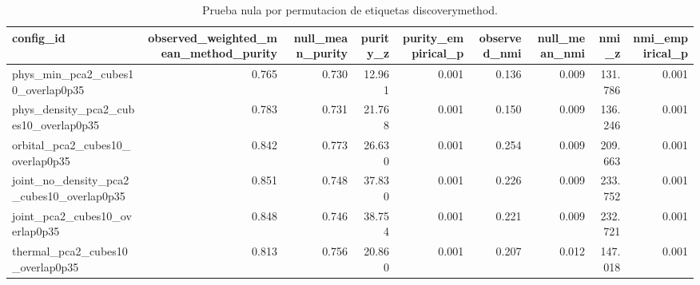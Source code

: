 \begin{table}[H]
\centering
\scriptsize
\caption{Prueba nula por permutacion de etiquetas discoverymethod.}
\label{tab:bias_permutation_null}
\begin{adjustbox}{max width=\linewidth}
\begin{tabular}{lrrrrrrrr}
\toprule
config\_id & observed\_weighted\_mean\_method\_purity & null\_mean\_purity & purity\_z & purity\_empirical\_p & observed\_nmi & null\_mean\_nmi & nmi\_z & nmi\_empirical\_p \\
\midrule
phys\_min\_pca2\_cubes10\_overlap0p35 & 0.765 & 0.730 & 12.961 & 0.001 & 0.136 & 0.009 & 131.786 & 0.001 \\
phys\_density\_pca2\_cubes10\_overlap0p35 & 0.783 & 0.731 & 21.768 & 0.001 & 0.150 & 0.009 & 136.246 & 0.001 \\
orbital\_pca2\_cubes10\_overlap0p35 & 0.842 & 0.773 & 26.630 & 0.001 & 0.254 & 0.009 & 209.663 & 0.001 \\
joint\_no\_density\_pca2\_cubes10\_overlap0p35 & 0.851 & 0.748 & 37.830 & 0.001 & 0.226 & 0.009 & 233.752 & 0.001 \\
joint\_pca2\_cubes10\_overlap0p35 & 0.848 & 0.746 & 38.754 & 0.001 & 0.221 & 0.009 & 232.721 & 0.001 \\
thermal\_pca2\_cubes10\_overlap0p35 & 0.813 & 0.756 & 20.860 & 0.001 & 0.207 & 0.012 & 147.018 & 0.001 \\
\bottomrule
\end{tabular}
\end{adjustbox}

\end{table}
